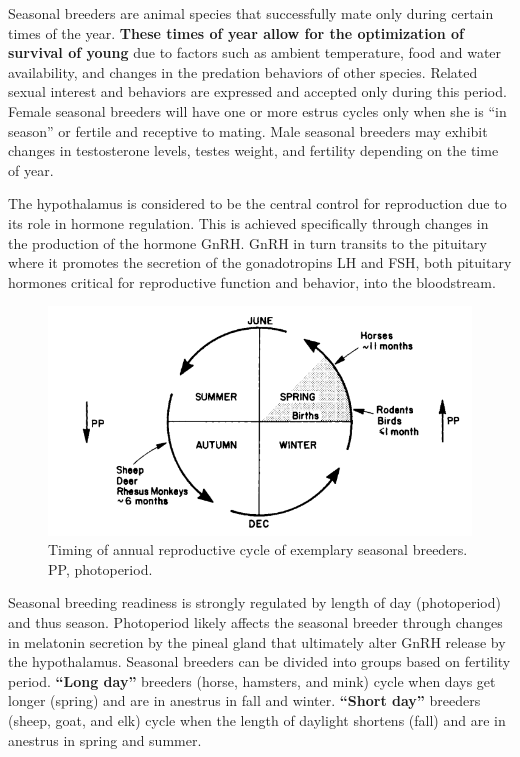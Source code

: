 \documentclass[]{book}
\begin{document}
Seasonal breeders are animal species that successfully mate only during certain times of the year. \textbf{These times of year allow for the optimization of survival of young} due to factors such as ambient temperature, food and water availability, and changes in the predation behaviors of other species. Related sexual interest and behaviors are expressed and accepted only during this period. Female seasonal breeders will have one or more estrus cycles only when she is ``in season'' or fertile and receptive to mating. Male seasonal breeders may exhibit changes in testosterone levels, testes weight, and fertility depending on the time of year.

The hypothalamus is considered to be the central control for reproduction due to its role in hormone regulation. This is achieved specifically through changes in the production of the hormone GnRH. GnRH in turn transits to the pituitary where it promotes the secretion of the gonadotropins LH and FSH, both pituitary hormones critical for reproductive function and behavior, into the bloodstream.

\begin{figure}

{\centering \includegraphics[width=0.7\linewidth]{figures/seasonal-breed} 

}

\caption{Timing of annual reproductive cycle of exemplary seasonal breeders. PP, photoperiod. }\label{fig:seaonal-breed}
\end{figure}

Seasonal breeding readiness is strongly regulated by length of day (photoperiod) and thus season. Photoperiod likely affects the seasonal breeder through changes in melatonin secretion by the pineal gland that ultimately alter GnRH release by the hypothalamus. Seasonal breeders can be divided into groups based on fertility period. \textbf{``Long day''} breeders (horse, hamsters, and mink) cycle when days get longer (spring) and are in anestrus in fall and winter. \textbf{``Short day''} breeders (sheep, goat, and elk) cycle when the length of daylight shortens (fall) and are in anestrus in spring and summer.
\end{document}

